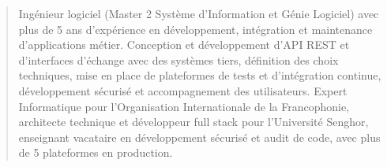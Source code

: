 \documentclass[10pt,a4paper,ragged2e,withhyper]{altacv}
\begin{document}

    
    \makecvheader

    \begin{quote}
    \normalsize Ingénieur logiciel (Master 2 Système d'Information et Génie Logiciel) avec plus de 5 ans d'expérience en développement, intégration et maintenance d'applications métier. Conception et développement d'API REST et d'interfaces d'échange avec des systèmes tiers, définition des choix techniques, mise en place de plateformes de tests et d'intégration continue, développement sécurisé et accompagnement des utilisateurs. Expert Informatique pour l'Organisation Internationale de la Francophonie, architecte technique et développeur full stack pour l'Université Senghor, enseignant vacataire en développement sécurisé et audit de code, avec plus de 5 plateformes en production.
    \end{quote}
    \vspace{-0.5em}

\end{document}

